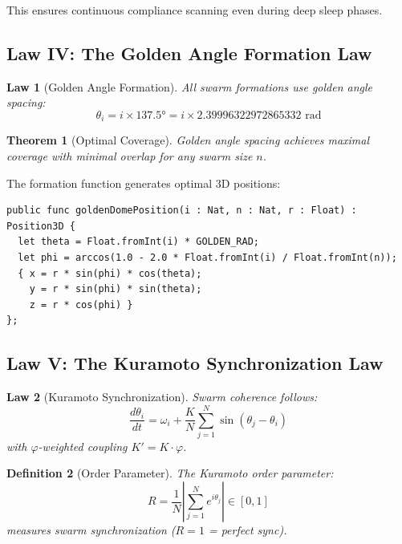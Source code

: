 \documentclass[12pt]{article}
\newtheorem{theorem}{Theorem}
\newtheorem{definition}[theorem]{Definition}
\newtheorem{law}{Law}
\newcommand{\PHI}{\varphi}
\begin{document}
This ensures continuous compliance scanning even during deep sleep phases.

\subsection{Law IV: The Golden Angle Formation Law}

\begin{law}[Golden Angle Formation]
All swarm formations use golden angle spacing:
\begin{equation}
  \theta_i = i \times 137.5° = i \times 2.39996322972865332 \text{ rad}
\end{equation}
\end{law}

\begin{theorem}[Optimal Coverage]
Golden angle spacing achieves maximal coverage with minimal overlap for any swarm size $n$.
\end{theorem}

The formation function generates optimal 3D positions:
\begin{verbatim}
public func goldenDomePosition(i : Nat, n : Nat, r : Float) : Position3D {
  let theta = Float.fromInt(i) * GOLDEN_RAD;
  let phi = arccos(1.0 - 2.0 * Float.fromInt(i) / Float.fromInt(n));
  { x = r * sin(phi) * cos(theta);
    y = r * sin(phi) * sin(theta);
    z = r * cos(phi) }
};
\end{verbatim}

\subsection{Law V: The Kuramoto Synchronization Law}

\begin{law}[Kuramoto Synchronization]
Swarm coherence follows:
\begin{equation}
  \frac{d\theta_i}{dt} = \omega_i + \frac{K}{N} \sum_{j=1}^{N} \sin(\theta_j - \theta_i)
\end{equation}
with $\PHI$-weighted coupling $K' = K \cdot \PHI$.
\end{law}

\begin{definition}[Order Parameter]
The Kuramoto order parameter:
\begin{equation}
  R = \frac{1}{N} \left| \sum_{j=1}^{N} e^{i\theta_j} \right| \in [0,1]
\end{equation}
measures swarm synchronization ($R=1$ = perfect sync).
\end{definition}
\end{document}
